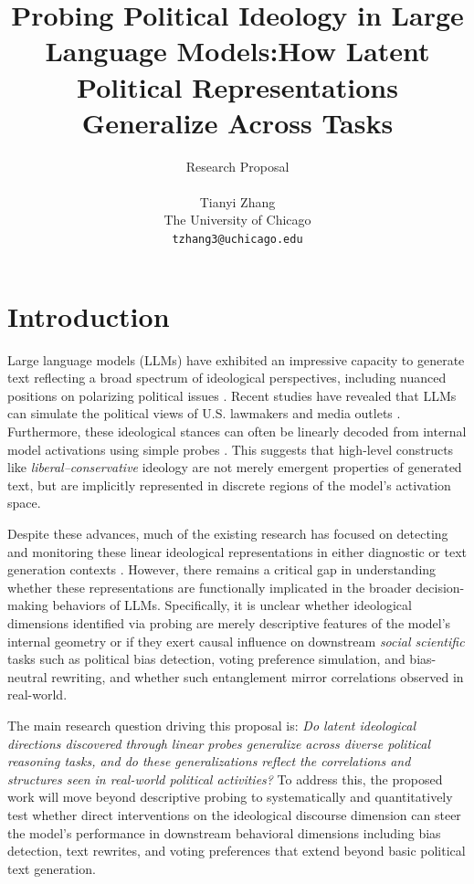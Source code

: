 \documentclass[11pt]{article}
\title{Probing Political Ideology in Large Language Models:\break How Latent Political Representations Generalize Across Tasks}
\author{
    Research Proposal \\
    \\
    Tianyi Zhang \\
    The University of Chicago \\
    \texttt{tzhang3@uchicago.edu}
}
\begin{document}
\maketitle
\thispagestyle{plain}
\pagestyle{plain}

\section{Introduction}

Large language models (LLMs) have exhibited an impressive capacity to generate text reflecting a broad spectrum of ideological perspectives, including nuanced positions on polarizing political issues \citep{argyleOutOneMany2023, kimLinearRepresentationsPolitical2025, wuLargeLanguageModels2023a, lemensPositioningPoliticalTexts2025}. Recent studies have revealed that LLMs can simulate the political views of U.S. lawmakers and media outlets \citep{pmlr-v202-santurkar23a, bernardelleMappingInfluencingPolitical2024}. Furthermore, these ideological stances can often be linearly decoded from internal model activations using simple probes \citep{kimLinearRepresentationsPolitical2025, parkLinearRepresentationHypothesis2024}. This suggests that high-level constructs like \textit{liberal--conservative} ideology are not merely emergent properties of generated text, but are implicitly represented in discrete regions of the model's activation space.

Despite these advances, much of the existing research has focused on detecting and monitoring these linear ideological representations in either diagnostic \citep{gurneeLanguageModelsRepresent2023, tiggesLinearRepresentationsSentiment2023} or text generation contexts \citep{marksGeometryTruthEmergent2023, kimLinearRepresentationsPolitical2025}. However, there remains a critical gap in understanding whether these representations are functionally implicated in the broader decision-making behaviors of LLMs. Specifically, it is unclear whether ideological dimensions identified via probing are merely descriptive features of the model’s internal geometry or if they exert causal influence on downstream \textit{social scientific} tasks such as political bias detection, voting preference simulation, and bias-neutral rewriting, and whether such entanglement mirror correlations observed in real-world.

The main research question driving this proposal is: \textit{Do latent ideological directions discovered through linear probes generalize across diverse political reasoning tasks, and do these generalizations reflect the correlations and structures seen in real-world political activities?} To address this, the proposed work will move beyond descriptive probing to systematically and quantitatively test whether direct interventions on the ideological discourse dimension can steer the model’s performance in downstream behavioral dimensions including bias detection, text rewrites, and voting preferences that extend beyond basic political text generation.
\end{document}
